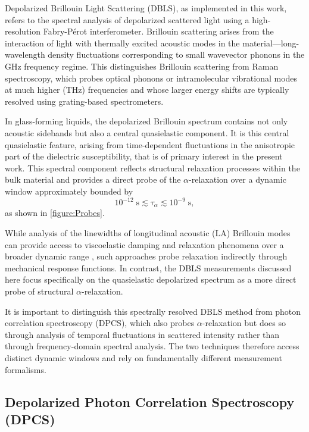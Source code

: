 Depolarized Brillouin Light Scattering (DBLS), as implemented in this work, refers to the spectral analysis of depolarized scattered light using a high-resolution Fabry-P\'erot interferometer. Brillouin scattering arises from the interaction of light with thermally excited acoustic modes in the material—long-wavelength density fluctuations corresponding to small wavevector phonons in the GHz frequency regime. This distinguishes Brillouin scattering from Raman spectroscopy, which probes optical phonons or intramolecular vibrational modes at much higher (THz) frequencies and whose larger energy shifts are typically resolved using grating-based spectrometers.

In glass-forming liquids, the depolarized Brillouin spectrum contains not only acoustic sidebands but also a central quasielastic component. It is this central quasielastic feature, arising from time-dependent fluctuations in the anisotropic part of the dielectric susceptibility, that is of primary interest in the present work. This spectral component reflects structural relaxation processes within the bulk material and provides a direct probe of the $\alpha$-relaxation over a dynamic window approximately bounded by 
\[
10^{-12}\;\si{\second} \lesssim \tau_\alpha \lesssim 10^{-9}\;\si{\second},
\]
as shown in \fig \nolinebreak \ref{figure:Probes}.

While analysis of the linewidths of longitudinal acoustic (LA) Brillouin modes can provide access to viscoelastic damping and relaxation phenomena over a broader dynamic range \cite{Heiman}, such approaches probe relaxation indirectly through mechanical response functions. In contrast, the DBLS measurements discussed here focus specifically on the quasielastic depolarized spectrum as a more direct probe of structural $\alpha$-relaxation.

It is important to distinguish this spectrally resolved DBLS method from photon correlation spectroscopy (DPCS), which also probes $\alpha$-relaxation but does so through analysis of temporal fluctuations in scattered intensity rather than through frequency-domain spectral analysis. The two techniques therefore access distinct dynamic windows and rely on fundamentally different measurement formalisms.

\subsection{Depolarized Photon Correlation Spectroscopy (DPCS)} \label{sec:PCSintro}

